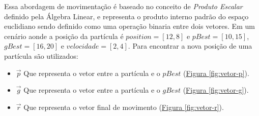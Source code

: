 Essa abordagem de movimentação é baseado no conceito de \textit{Produto Escalar} definido pela Álgebra Linear, e representa o produto interno padrão do espaço euclidiano sendo definido como uma operação binaria entre dois vetores.
Em um cenário aonde a posição da partícula é $position=[12,8]$ e $pBest=[10, 15]$, $gBest=[16,20]$ e $velocidade=[2,4]$.
Para encontrar a nova posição de uma partícula são utilizados:
\begin{itemize}
\item $\vec p$ Que representa o vetor entre a partícula e o $pBest$ 
(\hyperref[fig:vetor-p]{Figura \ref{fig:vetor-p}}).
\item $\vec g$ Que representa o vetor entre a partícula e o $gBest$ 
(\hyperref[fig:vetor-g]{Figura \ref{fig:vetor-g}}).
\item $\vec r$ Que representa o vetor final de movimento
(\hyperref[fig:vetor-r]{Figura \ref{fig:vetor-r}}).
\end{itemize}

